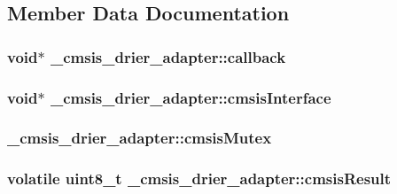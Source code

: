 \subsection{Member Data Documentation}
\hypertarget{struct__cmsis__drier__adapter_a3d93d5a2f3f34c0064bfbe5a4cf093a0}{
\subsubsection[{callback}]{\setlength{\rightskip}{0pt plus 5cm}void$\ast$ \-\_\-cmsis\-\_\-drier\-\_\-adapter\-::callback}}\label{struct__cmsis__drier__adapter_a3d93d5a2f3f34c0064bfbe5a4cf093a0}
\hypertarget{struct__cmsis__drier__adapter_a41bdda4fa1a6cae13f89934bf67c7449}{
\subsubsection[{cmsis\-Interface}]{\setlength{\rightskip}{0pt plus 5cm}void$\ast$ \-\_\-cmsis\-\_\-drier\-\_\-adapter\-::cmsis\-Interface}}\label{struct__cmsis__drier__adapter_a41bdda4fa1a6cae13f89934bf67c7449}
\hypertarget{struct__cmsis__drier__adapter_a952d05d8262ef9aebfa6ca9c4d62fe46}{
\subsubsection[{cmsis\-Mutex}]{ \-\_\-cmsis\-\_\-drier\-\_\-adapter\-::cmsis\-Mutex}}\label{struct__cmsis__drier__adapter_a952d05d8262ef9aebfa6ca9c4d62fe46}
\hypertarget{struct__cmsis__drier__adapter_a4197e11173243ee2211120a5073ea53a}{
\subsubsection[{cmsis\-Result}]{\setlength{\rightskip}{0pt plus 5cm}volatile uint8\-\_\-t \-\_\-cmsis\-\_\-drier\-\_\-adapter\-::cmsis\-Result}}\label{struct__cmsis__drier__adapter_a4197e11173243ee2211120a5073ea53a}

